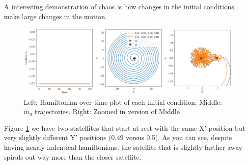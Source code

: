 \documentclass[11pt]{article}
\begin{document}
\\
\\
\noindent
A interesting demonstration of chaos is how changes in the initial conditions make large changes in the motion. 
\begin{figure}[H]
    \centering
    \includegraphics[width=0.7\linewidth]{figures/superchaotic.png}
    \caption{Left: Hamiltonian over time plot of each initial condition. Middle: $m_0$ trajectories. Right: Zoomed in version of Middle}
    \label{fig:interesting trajectories2}
\end{figure}
\noindent
Figure \ref{fig:interesting trajectories2} we have two statellites that start at rest with the same X'-position but very slightly different Y' positions (0.49 versus 0.5). As you can see, despite having nearly indentical hamiltonians, the satellite that is slightly farther away spirals out way more than the closer satellite.
\end{document}
